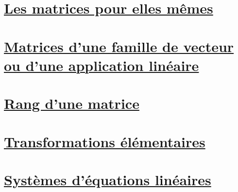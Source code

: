 

\section{\href{\baseurl C2232.pdf}{Les matrices pour elles mêmes}}

\section{\href{\baseurl C2233.pdf}{Matrices d'une famille de vecteur ou d'une application linéaire}}

\section{\href{\baseurl C6012.pdf}{Rang  d'une matrice}}

\section{\href{\baseurl C2234.pdf}{Transformations élémentaires}}

\section{\href{\baseurl C1625.pdf}{Systèmes d'équations linéaires}}

